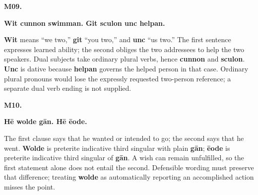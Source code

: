 \par\begin{minipage}{\linewidth}\raggedright
\textbf{M09.}

\textbf{Wit cunnon swimman. Git sculon unc helpan.}

\textbf{Wit} means “we two,” \textbf{git} “you two,” and \textbf{unc} “us two.” The first sentence expresses learned ability; the second obliges the two addressees to help the two speakers. Dual subjects take ordinary plural verbs, hence \textbf{cunnon} and \textbf{sculon}. \textbf{Unc} is dative because \textbf{helpan} governs the helped person in that case. Ordinary plural pronouns would lose the expressly requested two-person reference; a separate dual verb ending is not supplied.

\end{minipage}\par\addvspace{4pt}

\par\begin{minipage}{\linewidth}\raggedright
\textbf{M10.}

\textbf{Hē wolde gān. Hē ēode.}

The first clause says that he wanted or intended to go; the second says that he went. \textbf{Wolde} is preterite indicative third singular with plain \textbf{gān}; \textbf{ēode} is preterite indicative third singular of \textbf{gān}. A wish can remain unfulfilled, so the first statement alone does not entail the second. Defensible wording must preserve that difference; treating \textbf{wolde} as automatically reporting an accomplished action misses the point.

\end{minipage}\par\addvspace{4pt}


